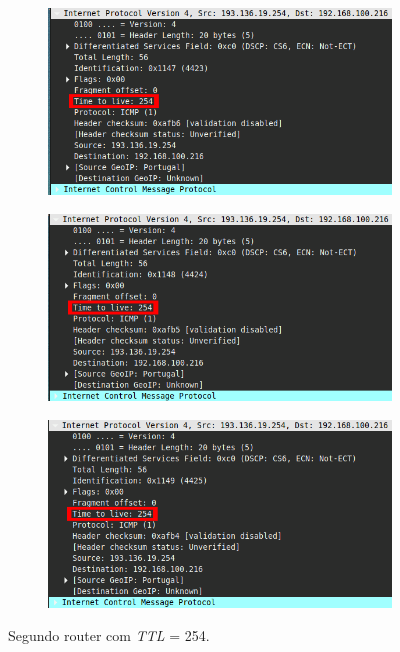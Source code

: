 \documentclass{llncs}
\begin{document}
\begin{figure}[h]
	\centering
	\begin{subfigure}{.4\textwidth}
		\centering
		\includegraphics[width=0.98\linewidth]{./imagens/icmp_1_TTL254_router.png}
	\end{subfigure}%
	\begin{subfigure}{.4\textwidth}
		\centering
		\includegraphics[width=0.98\linewidth]{./imagens/icmp_2_TTL254_router.png}
	\end{subfigure}%
	\begin{subfigure}{.4\textwidth}
		\centering
		\includegraphics[width=0.98\linewidth]{./imagens/icmp_3_TTL254_router.png}
	\end{subfigure}
	\caption{Segundo router com \textit{TTL} = 254.}
	\label{fig:field_change}
\end{figure}
\end{document}
